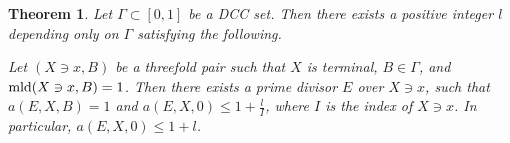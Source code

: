 \documentclass[11pt]{amsart}
\numberwithin{equation}{section}
\newcommand{\mld}{{\rm{mld}}}
\newcommand{\mult}{\operatorname{mult}}
\newcommand{\Ii}{{\Gamma}}
\newtheorem{thm}{Theorem}[section]
\theoremstyle{definition}
\theoremstyle{definition}
\begin{document}

\begin{thm}\label{thm: Nakamura Mustata Conjecture}
Let $\Ii \subset [0,1]$ be a DCC set. Then there exists a positive integer $l$ depending only on $\Ii$ satisfying the following.

Let $(X\ni x,B)$ be a threefold pair such that $X$ is terminal, $B\in \Ii$, and $\mld(X\ni x,B)=1$. Then there exists a prime divisor $E$ over $X\ni x$, such that $a(E,X,B)=1$ and $a(E,X,0)\le 1+\frac{l}{I}$, where $I$ is the index of $X\ni x$. In particular,  $a(E,X,0)\le 1+l$.
\end{thm}
\end{document}
